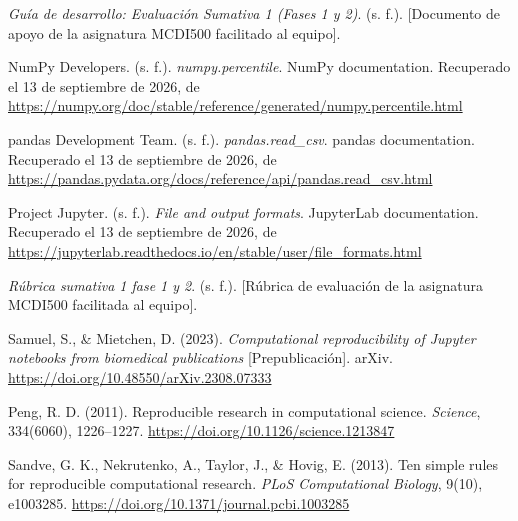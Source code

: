 \begin{thebibliography}{}

\emph{Guía de desarrollo: Evaluación Sumativa 1 (Fases 1 y 2)}. (s. f.).
[Documento de apoyo de la asignatura MCDI500 facilitado al equipo].

NumPy Developers. (s. f.). \emph{numpy.percentile}. NumPy documentation.
Recuperado el 13 de septiembre de 2026, de
\url{https://numpy.org/doc/stable/reference/generated/numpy.percentile.html}

pandas Development Team. (s. f.). \emph{pandas.read\_csv}. pandas documentation.
Recuperado el 13 de septiembre de 2026, de
\url{https://pandas.pydata.org/docs/reference/api/pandas.read_csv.html}

Project Jupyter. (s. f.). \emph{File and output formats}. JupyterLab documentation.
Recuperado el 13 de septiembre de 2026, de
\url{https://jupyterlab.readthedocs.io/en/stable/user/file_formats.html}

\emph{Rúbrica sumativa 1 fase 1 y 2}. (s. f.).
[Rúbrica de evaluación de la asignatura MCDI500 facilitada al equipo].

Samuel, S., \& Mietchen, D. (2023).
\emph{Computational reproducibility of Jupyter notebooks from biomedical publications}
[Prepublicación]. arXiv.
\url{https://doi.org/10.48550/arXiv.2308.07333}

Peng, R. D. (2011).
Reproducible research in computational science.
\emph{Science}, 334(6060), 1226--1227.
\url{https://doi.org/10.1126/science.1213847}

Sandve, G. K., Nekrutenko, A., Taylor, J., \& Hovig, E. (2013).
Ten simple rules for reproducible computational research.
\emph{PLoS Computational Biology}, 9(10), e1003285.
\url{https://doi.org/10.1371/journal.pcbi.1003285}

\end{thebibliography}
